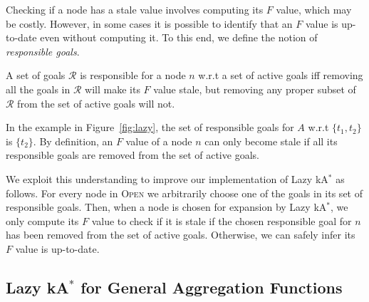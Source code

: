 \documentclass[smallextended]{svjour3}       %
\newcommand{\kastar}{kA$^*$\xspace}
\newcommand{\open}{\textsc{Open}\xspace}
\begin{document}
Checking if a node has a stale value involves computing its $F$ value, which may be costly. However, in some cases it is possible to identify that an $F$ value is up-to-date even without computing it. 
To this end, we define the notion of \emph{responsible goals}. 

\begin{definition}
A set of goals $\mathcal{R}$ is responsible for a node $n$ w.r.t a set of active goals iff removing all the goals in $\mathcal{R}$ will make its $F$ value stale, but removing any proper subset of $\mathcal{R}$ from the set of active goals will not. 
\end{definition}
In the example in Figure~\ref{fig:lazy}, the set of responsible goals for $A$ w.r.t $\{t_1, t_2\}$ is $\{t_2\}$.  By definition, an $F$ value of a node $n$ can only become stale if all its responsible goals are removed from the set of active goals. 

We exploit this understanding to improve our implementation of Lazy \kastar as follows. For every node in \open we arbitrarily choose one of the goals in its set of responsible goals. 
Then, when a node is chosen for expansion by Lazy \kastar, we only compute its $F$ value to check if it is stale if the chosen responsible goal for $n$ has been removed from the set of active goals. Otherwise, we can safely infer its $F$ value is up-to-date. 






\subsection{Lazy \kastar for General Aggregation Functions}
\end{document}
